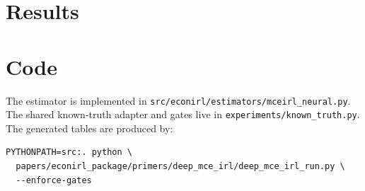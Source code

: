 \documentclass[10pt]{article}
\begin{document}
\section{Results}



\section{Code}

The estimator is implemented in
\texttt{src/econirl/estimators/mceirl\_neural.py}. The shared known-truth
adapter and gates live in \texttt{experiments/known\_truth.py}. The generated
tables are produced by:
\begin{verbatim}
PYTHONPATH=src:. python \
  papers/econirl_package/primers/deep_mce_irl/deep_mce_irl_run.py \
  --enforce-gates
\end{verbatim}



\end{document}
